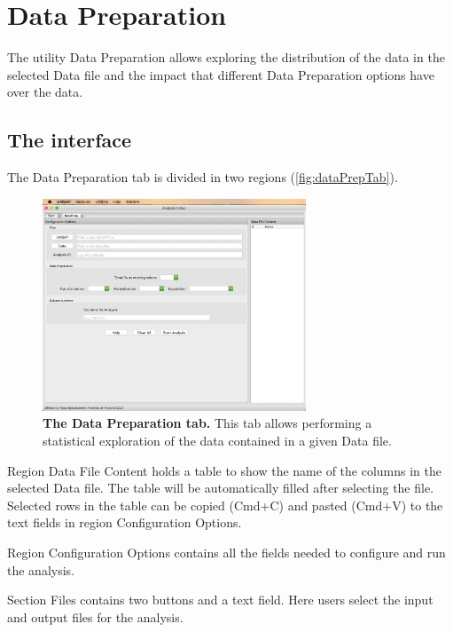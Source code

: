 \chapter{Data Preparation}
\label{chap:dataPrep}

The utility Data Preparation allows exploring the distribution of the data in the
selected Data file and the impact that different Data Preparation options have over
the data.

\section{The interface}

The Data Preparation tab is divided in two regions (\autoref{fig:dataPrepTab}).

\begin{figure}[h]
    \centering
    \includegraphics[width=0.7\textwidth]{./IMAGES/DATAPREP/DataPrep.jpg}
    \caption[The Data Preparation tab]{\textbf{The Data Preparation tab.}
    This tab allows performing a statistical exploration of the data contained in
    a given Data file.} 
    \label{fig:dataPrepTab}
    \vspace{-5pt}
\end{figure}

Region Data File Content holds a table to show the name of the columns in
the selected Data file. The table will be automatically filled after selecting the
file. Selected rows in the table can be copied (Cmd+C) and pasted (Cmd+V) to the
text fields in region Configuration Options.

Region Configuration Options contains all the fields needed to configure and
run the analysis. 

Section Files contains two buttons and a text field. Here users select the input
and output files for the analysis.

